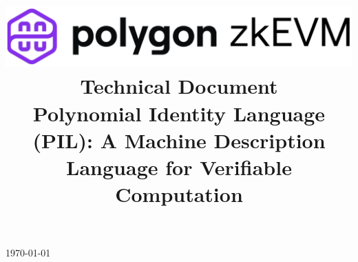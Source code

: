 \documentclass[preprint]{iacrtrans}
\title{
	\includegraphics[width=\columnwidth]{logo_zkEVM.png} 	\\ \vspace{0.3cm}
	Technical Document 										\\ \vspace{0.3cm}	
	Polynomial Identity Language (PIL): A Machine Description Language for Verifiable Computation		\\ \vspace{0.3cm}
	\version
}
\institute{}
\begin{document}
\begin{titlepage}
\centering
\maketitle
\today
\vspace{-5mm}
\end{titlepage}


{\hypersetup{linkcolor=.}\tableofcontents}

\newpage



\newpage


\end{document}
